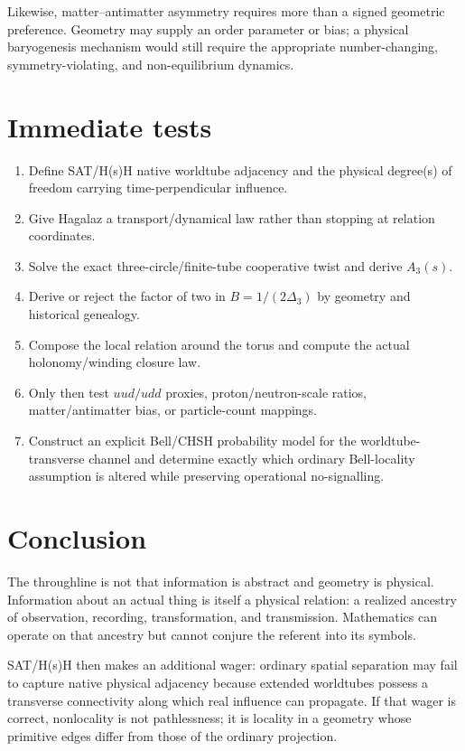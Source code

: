 \documentclass[11pt]{article}
\newcommand{\HsH}{H(s)H\xspace}
\begin{document}
Likewise, matter--antimatter asymmetry requires more than a signed geometric preference. Geometry may supply an order parameter or bias; a physical baryogenesis mechanism would still require the appropriate number-changing, symmetry-violating, and non-equilibrium dynamics.

\section{Immediate tests}

\begin{enumerate}[leftmargin=1.6em]
\item Define SAT/\HsH native worldtube adjacency and the physical degree(s) of freedom carrying time-perpendicular influence.
\item Give Hagalaz a transport/dynamical law rather than stopping at relation coordinates.
\item Solve the exact three-circle/finite-tube cooperative twist and derive $A_3(s)$.
\item Derive or reject the factor of two in $B=1/(2\Delta_3)$ by geometry and historical genealogy.
\item Compose the local relation around the torus and compute the actual holonomy/winding closure law.
\item Only then test $uud/udd$ proxies, proton/neutron-scale ratios, matter/antimatter bias, or particle-count mappings.
\item Construct an explicit Bell/CHSH probability model for the worldtube-transverse channel and determine exactly which ordinary Bell-locality assumption is altered while preserving operational no-signalling.
\end{enumerate}

\section{Conclusion}

The throughline is not that information is abstract and geometry is physical. Information about an actual thing is itself a physical relation: a realized ancestry of observation, recording, transformation, and transmission. Mathematics can operate on that ancestry but cannot conjure the referent into its symbols.

SAT/\HsH then makes an additional wager: ordinary spatial separation may fail to capture native physical adjacency because extended worldtubes possess a transverse connectivity along which real influence can propagate. If that wager is correct, nonlocality is not pathlessness; it is locality in a geometry whose primitive edges differ from those of the ordinary projection.
\end{document}
